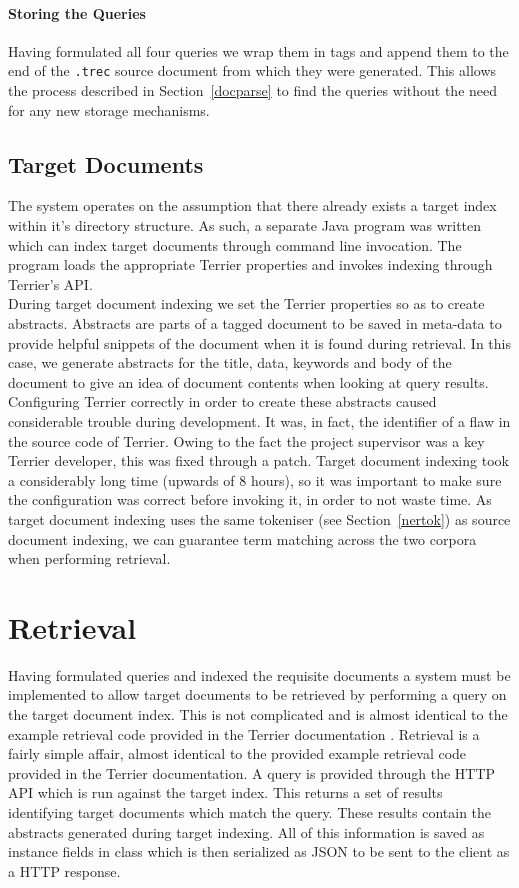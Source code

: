 \documentclass{l4proj}
\newcommand{\code}[1]{\texttt{#1}}
\begin{document}
\paragraph{Storing the Queries}
Having formulated all four queries we wrap them in tags and append them to the end of the \code{.trec} source document from which they were generated. This allows the process described in Section~\ref{docparse} to find the queries without the need for any new storage mechanisms.

\subsection{Target Documents}
The system operates on the assumption that there already exists a target index within it's directory structure.
As such, a separate Java program was written which can index target documents through command line invocation. The program loads the appropriate Terrier properties and invokes indexing through Terrier's API. \\ During target document indexing we set the Terrier properties so as to create abstracts. Abstracts are parts of a tagged document to be saved in meta-data to provide helpful snippets of the document when it is found during retrieval. In this case, we generate abstracts for the title, data, keywords and body of the document to give an idea of document contents when looking at query results.
Configuring Terrier correctly in order to create these abstracts caused considerable trouble during development. It was, in fact, the identifier of a flaw in the source code of Terrier. Owing to the fact the project supervisor was a key Terrier developer, this was fixed through a patch. Target document indexing took a considerably long time (upwards of 8 hours), so it was important to make sure the configuration was correct before invoking it, in order to not waste time. 
As target document indexing uses the same tokeniser (see Section~\ref{nertok}) as source document indexing, we can guarantee term matching across the two corpora when performing retrieval.

\section{Retrieval}
Having formulated queries and indexed the requisite documents a system must be implemented to allow target documents to be retrieved by performing a query on the target document index. This is not complicated and is almost identical to the example retrieval code provided in the Terrier documentation \cite{terrier_retrieval}.
Retrieval is a fairly simple affair, almost identical to the provided example retrieval code provided in the Terrier documentation.
A query is provided through the HTTP API which is run against the target index. This returns a set of results identifying target documents which match the query. These results contain the abstracts generated during target indexing. All of this information is saved as instance fields in class which is then serialized as JSON to be sent to the client as a HTTP response.
\end{document}
